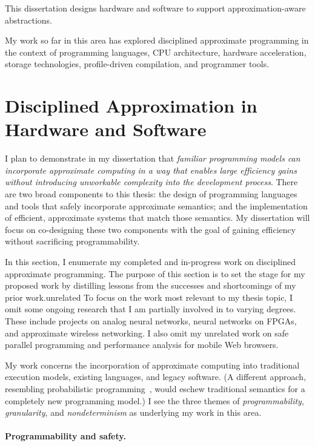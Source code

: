 This dissertation designs hardware and software to support approximation-aware abstractions.

My work so far in this area has explored disciplined approximate programming
in the context of programming languages, CPU architecture, hardware
acceleration, storage technologies, profile-driven compilation, and programmer
tools.


\section{Disciplined Approximation in Hardware and Software}

I plan to demonstrate in my dissertation that \textit{familiar programming
models can incorporate approximate computing in a way that enables large
efficiency gains without introducing unworkable complexity into the
development process}. There are two broad components to this thesis: the
design of programming languages and tools that safely incorporate approximate
semantics; and the implementation of efficient, approximate systems that match
those semantics. My dissertation will focus on co-designing these two
components with the goal of gaining efficiency without sacrificing
programmability.



In this section, I enumerate my completed and in-progress work on
disciplined approximate programming. The purpose of this section is to set the stage
for my proposed work by distilling lessons from the successes and shortcomings
of my prior work.unrelated 
To focus on the work most relevant to my thesis topic, I omit some ongoing
research that I am partially involved in to varying degrees. These include
projects on analog neural networks, neural networks on FPGAs, and approximate
wireless networking.
I also omit my unrelated work on safe parallel programming and
performance analysis for mobile Web browsers.

My work concerns the incorporation of approximate computing
into traditional execution models, existing
languages, and legacy software.
(A different approach, resembling probabilistic
programming~\cite{church}, would eschew traditional semantics for a completely
new programming model.)
I see the three themes of \emph{programmability},
\emph{granularity}, and \emph{nondeterminism} as underlying my work in this
area.

\paragraph{Programmability and safety.}

